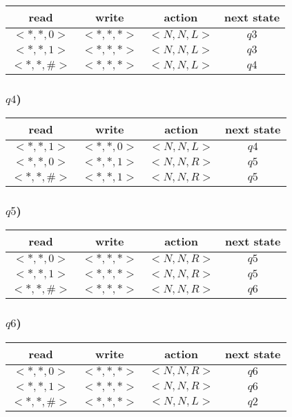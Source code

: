 \documentclass{article}
\begin{document}
\begin{longtable}{c|c|c|c}
read & write & action & next state\\
\hline
$<*,*,0>$ & $<*,*,*>$ & $<N,N,L>$ & $q3$\\
$<*,*,1>$ & $<*,*,*>$ & $<N,N,L>$ & $q3$\\
$<*,*,\#>$ & $<*,*,*>$ & $<N,N,L>$ & $q4$\\
\end{longtable}

\subsubsection*{$q4$)}

\begin{longtable}{c|c|c|c}
read & write & action & next state\\
\hline
$<*,*,1>$ & $<*,*,0>$ & $<N,N,L>$ & $q4$\\
$<*,*,0>$ & $<*,*,1>$ & $<N,N,R>$ & $q5$\\
$<*,*,\#>$ & $<*,*,1>$ & $<N,N,R>$ & $q5$\\
\end{longtable}

\subsubsection*{$q5$)}

\begin{longtable}{c|c|c|c}
read & write & action & next state\\
\hline
$<*,*,0>$ & $<*,*,*>$ & $<N,N,R>$ & $q5$\\
$<*,*,1>$ & $<*,*,*>$ & $<N,N,R>$ & $q5$\\
$<*,*,\#>$ & $<*,*,*>$ & $<N,N,R>$ & $q6$\\
\end{longtable}

\subsubsection*{$q6$)}

\begin{longtable}{c|c|c|c}
read & write & action & next state\\
\hline
$<*,*,0>$ & $<*,*,*>$ & $<N,N,R>$ & $q6$\\
$<*,*,1>$ & $<*,*,*>$ & $<N,N,R>$ & $q6$\\
$<*,*,\#>$ & $<*,*,*>$ & $<N,N,L>$ & $q2$\\
\end{longtable}
\end{document}
